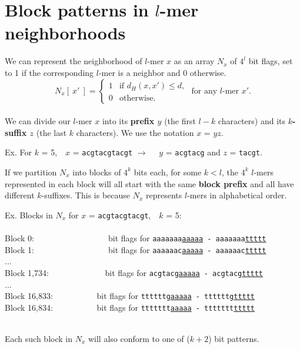 \documentclass[oneside,12pt]{DISCSthesis}
\begin{document}
	\section{\boldmath Block patterns in $l$-mer neighborhoods}
		We can represent the neighborhood of $l$-mer $x$ as an array $N_x$ of $4^{l}$ bit flags, set to 1 if the corresponding $l$-mer is a neighbor and 0 otherwise.\\
		\begin{equation}
			N_{x}[\ x'\ ] = \left\{
			\begin{array}{rl}
				1 & \text{if } d_H(x,x') \leq d,\\
				0 & \text{otherwise.}
			\end{array} \right.
			\text{ for any $l$-mer }x'.
			\end{equation}\\
		\noindent We can divide our $l$-mer $x$ into its {\bf\boldmath prefix $y$} (the first $l-k$ characters) and its {\bf\boldmath $k$-suffix $z$} (the last $k$ characters). We use the notation $x$ = $yz$.
		\begin{center}
			Ex. For $k$ = 5,\ \ $x$ = \texttt{acgtacgtacgt} $\rightarrow$ \ \ $y$ = \texttt{acgtacg} and $z$ = \texttt{tacgt}.
			\end{center}
		\noindent If we partition $N_x$ into blocks of $4^k$ bits each, for some $k < l$, the $4^k$ $l$-mers represented in each block will all start with the same {\bf block prefix} and all have different $k$-suffixes.	This is because $N_x$ represents $l$-mers in alphabetical order.
		\begin{center} 
			Ex. Blocks in $N_x$ for $x$ = \texttt{acgtacgtacgt},\ \ $k$ = 5:
			\ \ \ \ \ \ \ \ \ \ \ \ \ \ \ \ \ \ \ \ \ \ \ \ \ \ \ \ \ \ \\
			\footnotesize
			Block 0:\ \ \ \ \ \ \ \ \ \ \ \ \ \ \ \ \ \ bit flags for \texttt{{aaaaaaa}\ul{aaaaa} - {aaaaaaa}\ul{ttttt}}\\
			Block 1:\ \ \ \ \ \ \ \ \ \ \ \ \ \ \ \ \ \ bit flags for \texttt{{aaaaaac}\ul{aaaaa} - {aaaaaac}\ul{ttttt}}\\...\\
			Block 1,734:      \ \ \ \ \ \ \ \ \ \ \ \ \ bit flags for \texttt{{acgtacg}\ul{aaaaa} - {acgtacg}\ul{ttttt}}\\...\\
			Block 16,833:           \ \ \ \ \ \ \ \ \ \ bit flags for \texttt{{ttttttg}\ul{aaaaa} - {ttttttg}\ul{ttttt}}\\
			Block 16,834:           \ \ \ \ \ \ \ \ \ \ bit flags for \texttt{{ttttttt}\ul{aaaaa} - {ttttttt}\ul{ttttt}}\\\ \\
			\end{center}
		\noindent Each such block in $N_x$ will also conform to one of ($k+2$) bit patterns.\vspace*{4mm}
\end{document}
